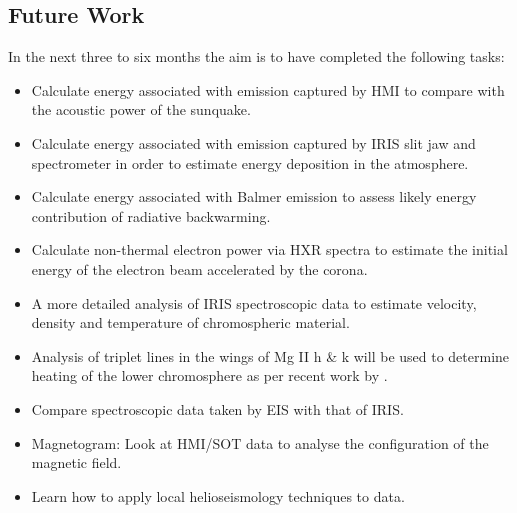 \subsection{Future Work}
In the next three to six months the aim is to have completed the following tasks:
\begin{itemize}

\item Calculate energy associated with emission captured by HMI to compare with the acoustic power of the sunquake. 

\item Calculate energy associated with emission captured by IRIS slit jaw and spectrometer in order to estimate energy deposition in the atmosphere. 

\item Calculate energy associated with Balmer emission to assess likely energy contribution of radiative backwarming. 

\item Calculate non-thermal electron power via HXR spectra to estimate the initial energy of the electron beam accelerated by the corona. 

\item A more detailed analysis of IRIS spectroscopic data to estimate velocity, density and temperature of chromospheric material. 

\item Analysis of triplet lines in the wings of Mg II h \& k will be used to determine heating of the lower chromosphere as per recent work by \cite{2015arXiv150401733P}. 

\item Compare spectroscopic data taken by EIS with that of IRIS. 

\item Magnetogram: Look at HMI/SOT data to analyse the configuration of the magnetic field.

\item Learn how to apply local helioseismology techniques to data.

\end{itemize}
